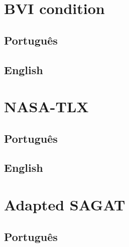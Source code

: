 

\section{BVI condition}
\label{sec:bvi_condition}

\subsection{Português}


\subsection{English}


\pagebreak

\section{NASA-TLX}
\label{apsec:nasa_tlx}

\subsection{Português}


\subsection{English}


\pagebreak

\section{Adapted SAGAT}
\label{apsec:sagat}

\subsection{Português}
\vspace{-0.25in}


